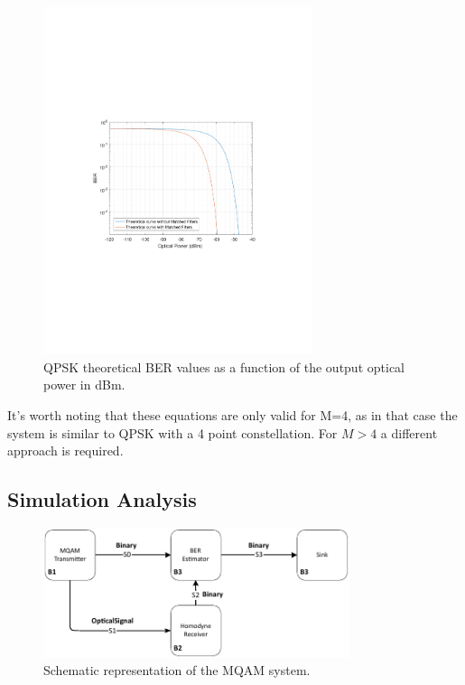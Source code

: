 \begin{figure}[h]
		\centering
		\includegraphics[clip, trim=4cm 8cm 4cm 8cm, width=0.7\textwidth]{./sdf/m_qam_system/figures/teor_BER_curves.pdf}
		\caption{QPSK theoretical BER values as a function of the output optical power in dBm.\label{fig:QPSK_th_curves}}	
\end{figure}


It's worth noting that these equations are only valid for M=4, as in that case the system is similar to QPSK with a 4 point constellation. For $M > 4$ a different approach is required.


\subsection{Simulation Analysis}

\begin{figure}[h]
	\centering
	\includegraphics[width=0.8\textwidth]{./sdf/m_qam_system/figures/simulation_mqam}
	\caption{Schematic representation of the MQAM system.}\label{MQAM_system_block_diagram}
\end{figure}

